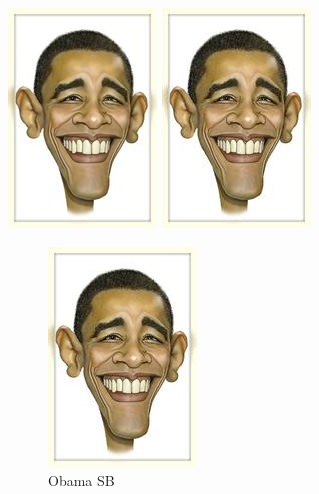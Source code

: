 \documentclass[12pt]{article}
\begin{document}
    \includegraphics[angle=180,origin=c]{obama.jpg}
    \includegraphics[angle=270,origin=c]{obama.jpg} \\

    \graphicspath{{c:/secret -garden/}}
    \graphicspath{{./}}
    \graphicspath{{one-little/}{two-little/}{three-little-indians/}}

    \begin{figure}[htbp]
        \centering  %
        \includegraphics{obama.jpg}
        \caption{Obama SB}  %
        \label{fig:myphoto} %
    \end{figure}
\end{document}
